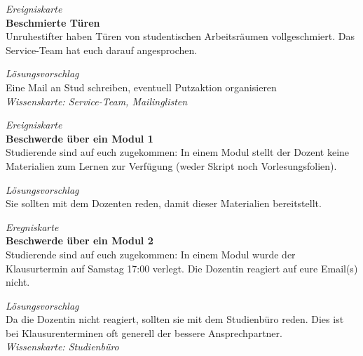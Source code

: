 \documentclass[a4paper,11pt]{scrartcl} %
\begin{document}
\begin{framed}
\textit{Ereigniskarte} \\

\textbf{Beschmierte Türen} \\
Unruhestifter haben Türen von studentischen Arbeitsräumen 
vollgeschmiert. Das Service-Team hat euch darauf angesprochen.
\end{framed}

\begin{framed}
\textit{Lösungsvorschlag} \\
Eine Mail an Stud schreiben, eventuell Putzaktion organisieren \\

\textit{Wissenskarte: Service-Team, Mailinglisten}
\end{framed}

\begin{framed}
\textit{Ereigniskarte} \\

\textbf{Beschwerde über ein Modul 1} \\
Studierende sind auf euch zugekommen: In einem Modul stellt der 
Dozent keine Materialien zum Lernen zur Verfügung (weder Skript 
noch Vorlesungsfolien). 
\end{framed}

\begin{framed}
\textit{Lösungsvorschlag} \\

Sie sollten mit dem Dozenten reden, damit dieser Materialien bereitstellt.

\end{framed}

\begin{framed}
\textit{Eregniskarte} \\

\textbf{Beschwerde über ein Modul 2} \\
Studierende sind auf euch zugekommen: In einem Modul wurde der
Klausurtermin auf Samstag 17:00 verlegt. Die Dozentin reagiert 
auf eure Email(s) nicht.
\end{framed}

\begin{framed}
\textit{Lösungsvorschlag} \\

Da die Dozentin nicht reagiert, sollten sie mit dem
Studienbüro reden. Dies ist bei Klausurenterminen oft 
generell der bessere Ansprechpartner. \\

\textit{Wissenskarte: Studienbüro}
\end{framed}
\end{document}
